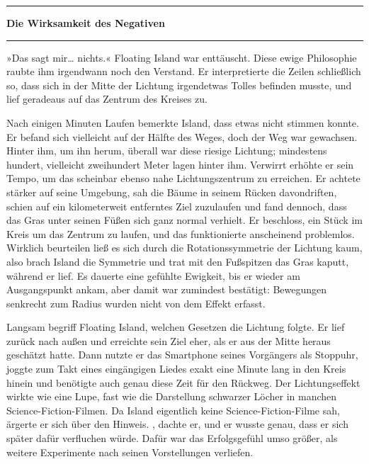 \noindent \parbox{\textwidth}{ \vspace{3ex} \hrule \vspace{3ex}

\textbf{Die Wirksamkeit des Negativen}



\vspace{3ex} \hrule \vspace{3ex} }

»Das sagt mir… nichts.« Floating Island war enttäuscht. Diese ewige Philosophie raubte ihm irgendwann noch den Verstand. Er interpretierte die Zeilen schließlich so, dass sich in der Mitte der Lichtung irgendetwas Tolles befinden musste, und lief geradeaus auf das Zentrum des Kreises zu.

Nach einigen Minuten Laufen bemerkte Island, dass etwas nicht stimmen konnte. Er befand sich vielleicht auf der Hälfte des Weges, doch der Weg war gewachsen. Hinter ihm, um ihn herum, überall war diese riesige Lichtung; mindestens hundert, vielleicht zweihundert Meter lagen hinter ihm. Verwirrt erhöhte er sein Tempo, um das scheinbar ebenso nahe Lichtungszentrum zu erreichen. Er achtete stärker auf seine Umgebung, sah die Bäume in seinem Rücken davondriften, schien auf ein kilometerweit entferntes Ziel zuzulaufen und fand dennoch, dass das Gras unter seinen Füßen sich ganz normal verhielt. Er beschloss, ein Stück im Kreis um das Zentrum zu laufen, und das funktionierte anscheinend problemlos. Wirklich beurteilen ließ es sich durch die Rotationssymmetrie der Lichtung kaum, also brach Island die Symmetrie und trat mit den Fußspitzen das Gras kaputt, während er lief. Es dauerte eine gefühlte Ewigkeit, bis er wieder am Ausgangspunkt ankam, aber damit war zumindest bestätigt: Bewegungen senkrecht zum Radius wurden nicht von dem Effekt erfasst.

Langsam begriff Floating Island, welchen Gesetzen die Lichtung folgte. Er lief zurück nach außen und erreichte sein Ziel eher, als er aus der Mitte heraus geschätzt hatte. Dann nutzte er das Smartphone seines Vorgängers als Stoppuhr, joggte zum Takt eines eingängigen Liedes exakt eine Minute lang in den Kreis hinein und benötigte auch genau diese Zeit für den Rückweg. Der Lichtungseffekt wirkte wie eine Lupe, fast wie die Darstellung schwarzer Löcher in manchen Science-Fiction-Filmen. Da Island eigentlich keine Science-Fiction-Filme sah, ärgerte er sich über den Hinweis. , dachte er, und er wusste genau, dass er sich später dafür verfluchen würde. Dafür war das Erfolgsgefühl umso größer, als weitere Experimente nach seinen Vorstellungen verliefen.

